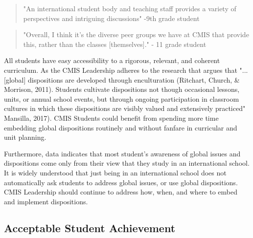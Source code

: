 \documentclass{report}
\begin{document}
\begin{findings}
\blockquote{"An international student body and teaching staff provides a variety of perspectives and intriguing discussions" -9th grade student}

\blockquote{"Overall, I think it's the diverse peer groups we have at CMIS that provide this, rather than the classes [themselves]." - 11 grade student}


All students have easy accessibility to a rigorous, relevant, and coherent curriculum.  As the CMIS Leadership adheres to the research that argues that   "...[global] dispositions are developed through enculturation (Ritchart, Church, \& Morrison, 2011). Students cultivate dispositions not though occasional lessons, units, or annual school events, but through ongoing participation in classroom cultures in which these dispositions are visibly valued and extensively practiced" Mansilla, 2017). CMIS Students could benefit from spending more time embedding global dispositions routinely and without fanfare in curricular and unit planning. 

Furthermore, data indicates that most student's awareness of global issues and dispositions come only from their view that they study in an international school. It is widely understood that just being in an international school does not automatically ask students to address global issues, or use global dispositions. CMIS Leadership should continue to address how, when, and where to embed and implement dispositions.  
\end{findings}

\subsection{Acceptable Student Achievement}


\end{document}
